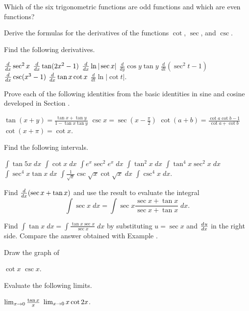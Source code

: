\begin{exercises}

Which of the six trigonometric functions are
odd functions and which are even functions?

Derive the formulas for the derivatives of the functions
$\cot$, $\sec$, and $\csc$.

Find the following derivatives.
\begin{exenum}
\x
$\frac{d}{dx} \sec^2 x$
\x
$\frac{d}{dx} \tan (2x^2 - 1)$
\x
$\frac{d}{dx} \ln |\sec x|$
\x
$\frac{d}{dy} \cos y \tan y$
\x
$\frac{d}{dt} (\sec^2t - 1)$
\x
$\frac{d}{dx} \csc (x^3 - 1)$
\x
$\frac{d}{dx} \tan x \cot x$
\x
$\frac{d}{dt} \ln |\cot t|$.
\end{exenum}

Prove each of the following identities from the
basic identities in sine and cosine
developed in Section .
\begin{exenum}
\x
$\tan(x+y) = \frac{\tan x + \tan y}{1 - \tan x \tan y}$
\x
$\csc x = \sec \left( x - \frac{\pi}2 \right)$
\x
$\cot(a+b) = \frac{\cot a\cot b-1}{\cot a+\cot b}$
\x
$\cot(x+\pi) = \cot x$.
\end{exenum}

Find the following intervals.
\begin{exenum}
\x
$\int \tan 5x \; dx$
\x
$\int \cot x \; dx$
\x
$\int e^x \sec^2 e^x \; dx$
\x
$\int \tan^2 x \; dx$ \quad
[\emph{Hint:} Use $\tan^2 x + 1 = \sec^2 x$.]
\x
$\int \tan^4 x \sec^2 x \; dx$
\x
$\int \sec^4 x \tan x \; dx$
\x
$\int \frac1{\sqrt{x}} \csc \sqrt{x} \cot \sqrt{x} \; dx$
\x
$\int \csc^4 x \; dx$.
\end{exenum}

Find $\frac{d}{dx} (\sec x + \tan x)$ and use the result
to evaluate the integral
\[
\int \sec x \; dx = \int \sec x
\frac{\sec x + \tan x}{\sec x + \tan x} \; dx
.
\]

Find $\int \tan x \; dx = \int \frac{\tan x \sec x}{\sec x} \; dx$
by substituting $u = \sec x$ and $\frac{d^{}{u}}{d{x}^{}}$
in the right side.
Compare the answer obtained with Example
.

Draw the graph of
\begin{exenum}
\x
$\cot x$
\x
$\csc x$.
\end{exenum}

Evaluate the following limits.
\begin{exenum}
\x
$\lim_{x\rightarrow0} \frac{\tan x}x$
\x
$\lim_{x\rightarrow0} x \cot 2x$.
\end{exenum}


\end{exercises}
